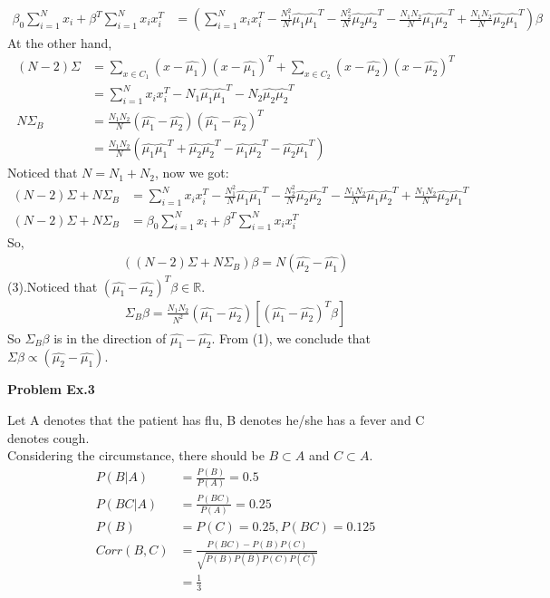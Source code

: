\documentclass[UTF8,12pt]{article}
\newenvironment{problem}[2][Problem]
{ \begin{mdframed}[backgroundcolor=gray!20] \textbf{#1 #2}}
	{  \end{mdframed}}
\newenvironment{answer}
{}
{}
\newenvironment{eq}
{
	\begin{equation}
		\begin{aligned}\nonumber
}
{
		\end{aligned}
	\end{equation}
}
\begin{document}
\begin{answer}
\begin{equation}
		\begin{aligned}\nonumber
			\beta_0 \sum_{i=1}^N x_i + \beta^T \sum_{i=1}^N x_i x_i^T 
		&= (\sum_{i=1}^N x_i x_i^T-\frac{N_1^2}{N} \hat{\mu_1}\hat{\mu_1}^T - \frac{N_2^2}{N} \hat{\mu_2}\hat{\mu_2}^T
		-\frac{N_1 N_2}{N} \hat{\mu_1}\hat{\mu_2}^T+ \frac{N_1 N_2}{N} \hat{\mu_2}\hat{\mu_1}^T)\beta
		\end{aligned}
	\end{equation}
	At the other hand,
	\begin{eq}
		(N-2)\Sigma&=\sum_{x\in C_1} (x-\hat{\mu_1})(x-\hat{\mu_1})^T + \sum_{x\in C_2} (x-\hat{\mu_2})(x-\hat{\mu_2})^T\\
		&= \sum_{i=1}^N x_i x_i^T - N_1 \hat{\mu_1}\hat{\mu_1}^T -N_2 \hat{\mu_2}\hat{\mu_2}^T\\
		N\Sigma_B &= \frac{N_1 N_2}{N}(\hat{\mu_1}-\hat{\mu_2})(\hat{\mu_1}-\hat{\mu_2})^T\\
		&= \frac{N_1 N_2}{N}(\hat{\mu_1}\hat{\mu_1}^T + \hat{\mu_2}\hat{\mu_2}^T - \hat{\mu_1}\hat{\mu_2}^T- \hat{\mu_2}\hat{\mu_1}^T)
	\end{eq}
	Noticed that $N=N_1+N_2$, now we got:
	\begin{eq}
		(N-2)\Sigma + N\Sigma_B&=
		\sum_{i=1}^N x_i x_i^T -\frac{N_1^2}{N} \hat{\mu_1}\hat{\mu_1}^T - \frac{N_2^2}{N} \hat{\mu_2}\hat{\mu_2}^T
		-\frac{N_1 N_2}{N} \hat{\mu_1}\hat{\mu_2}^T+ \frac{N_1 N_2}{N} \hat{\mu_2}\hat{\mu_1}^T\\
		(N-2)\Sigma+N\Sigma_B&=\beta_0 \sum_{i=1}^N x_i 
		+ \beta^T \sum_{i=1}^N x_i x_i^T 
	\end{eq}
	So,
	\begin{equation}
		\begin{aligned}
		((N-2)\Sigma+N\Sigma_B)\beta = N(\hat{\mu_2}-\hat{\mu_1})
		\end{aligned}
	\end{equation}
	(3).Noticed that $(\hat{\mu_1}-\hat{\mu_2})^T \beta\in \mathbb{R}$.
	\begin{eq}
		\Sigma_B\beta = \frac{N_1 N_2}{N^2}(\hat{\mu_1}-\hat{\mu_2})
		[(\hat{\mu_1}-\hat{\mu_2})^T \beta]
	\end{eq}
	So $\Sigma_B\beta$ is in the direction of $\hat{\mu_1}-\hat{\mu_2}$. From (1), we conclude that 
	$\Sigma\beta \propto(\hat{\mu_2}-\hat{\mu_1})$.
\end{answer}

\begin{problem}{Ex.3}
\end{problem}
\begin{answer}
	Let A denotes that the patient has flu, B denotes he/she has a fever and C denotes cough.\\
	Considering the circumstance, there should be $B \subset A$ and $C \subset A$.
\begin{eq}
	P(B|A)&=\frac{P(B)}{P(A)}=0.5\\
	P(BC|A)&=\frac{P(BC)}{P(A)}=0.25\\
	P(B)&=P(C)=0.25,P(BC)=0.125\\
	Corr(B,C)&=\frac{P(BC)-P(B)P(C)}{\sqrt{P(B)P(\bar{B})P(C)P(\bar{C})}}\\
	&= \frac{1}{3}
\end{eq}

\end{answer}
\end{document}
